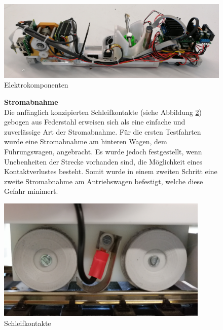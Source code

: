 \documentclass[../../main.tex]{subfiles}
\begin{document}
\begin{figure}[H]
  \centering
  \includegraphics[width=1\textwidth]{lokomotive3.PNG}
  \caption {Elektrokomponenten}
  \label{fig:elektrokomponenten}
\end{figure}

\begin{figure}[H]
  \begin{minipage}{.5\textwidth}
    \textbf{Stromabnahme}\\
    Die anfänglich konzipierten Schleifkontakte (siehe Abbildung \ref{fig:schleifkontakte}) gebogen aus Federstahl erweisen sich als eine einfache und zuverlässige Art der Stromabnahme. Für die ersten Testfahrten wurde eine Stromabnahme am hinteren Wagen, dem Führungswagen, angebracht. Es wurde jedoch festgestellt, wenn Unebenheiten der Strecke vorhanden sind, die Möglichkeit eines Kontaktverlustes besteht. Somit wurde in einem zweiten Schritt eine zweite Stromabnahme am Antriebswagen befestigt, welche diese Gefahr minimert.\\
   \end{minipage}
  \begin{minipage}{.5\textwidth}
    \flushright
    \includegraphics[width=0.9\textwidth]{schleifkontakt.PNG}
    \caption {Schleifkontakte}
    \label{fig:schleifkontakte}
    \end{minipage} 
\end{figure} 
\end{document}

